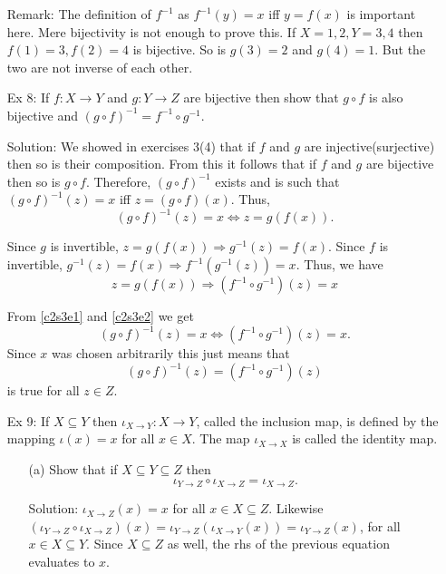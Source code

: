 \begin{enumerate}
Remark: The definition of $f^{-1}$ as $f^{-1}(y) = x$ iff $y = f(x)$ is 
important here. Mere bijectivity is not enough to prove this. If $X = {1, 
2}, Y = {3, 4}$ then $f(1) = 3, f(2) = 4$ is bijective. So is $g(3) = 2$
and $g(4) = 1$. But the two are not inverse of each other.

\item[Ex 8:] If $f: X \rightarrow Y$ and $g: Y \rightarrow Z$ are bijective
then show that $g \circ f$ is also bijective and $(g \circ f)^{-1} = f^{-1}
\circ g^{-1}$.
\item[Solution:] We showed in exercises 3(4) that if $f$ and $g$ are
injective(surjective) then so is their composition. From this it follows 
that if $f$ and $g$ are bijective then so is $g \circ f$. Therefore,
$(g \circ f)^{-1}$ exists and is such that $(g \circ f)^{-1}(z) = x$ iff
$z = (g \circ f)(x)$. Thus, 
\begin{equation}\label{c2s3e1}
(g \circ f)^{-1}(z) = x \Leftrightarrow z = g(f(x)). 
\end{equation}

Since $g$ is invertible, $z = g(f(x)) \Rightarrow g^{-1}(z) = f(x)$. Since
$f$ is invertible, $g^{-1}(z) = f(x) \Rightarrow f^{-1}(g^{-1}(z)) = x$.
Thus, we have 
\begin{equation}\label{c2s3e2}
z = g(f(x)) \Rightarrow (f^{-1} \circ g^{-1})(z) = x
\end{equation}

From \eqref{c2s3e1} and \eqref{c2s3e2} we get
\begin{equation}\label{c2s3e3}
(g \circ f)^{-1}(z) = x \Leftrightarrow (f^{-1} \circ g^{-1})(z) = x.
\end{equation}
Since $x$ was chosen arbitrarily this just means that
\begin{equation}\label{c2s3e4}
(g \circ f)^{-1}(z) = (f^{-1} \circ g^{-1})(z)
\end{equation}
is true for all $z \in Z$.

\item[Ex 9:] If $X \subseteq Y$ then $\iota_{X \rightarrow Y}:X 
\rightarrow Y$, called the inclusion map, is defined by the mapping 
$\iota(x) = x$ for all $x \in X$. The map $\iota_{X \rightarrow X}$ is
called the identity map.
\begin{enumerate}
\item[(a)] Show that if $X \subseteq Y \subseteq Z$ then 
\[
\iota_{Y \rightarrow Z} \circ \iota_{X \rightarrow Z} = 
\iota_{X \rightarrow Z}.
\]
\item[Solution:] $\iota_{X \rightarrow Z}(x) = x$ for all $x \in X 
\subseteq Z$. Likewise $(\iota_{Y \rightarrow Z} \circ \iota_{X \rightarrow
Z})(x) = \iota_{Y \rightarrow Z}(\iota_{X \rightarrow Y}(x)) =
\iota_{Y \rightarrow Z}(x)$, for all $x \in X \subseteq Y$. Since $X
\subseteq Z$ as well, the rhs of the previous equation evaluates to $x$.


\end{enumerate}
\end{enumerate}
